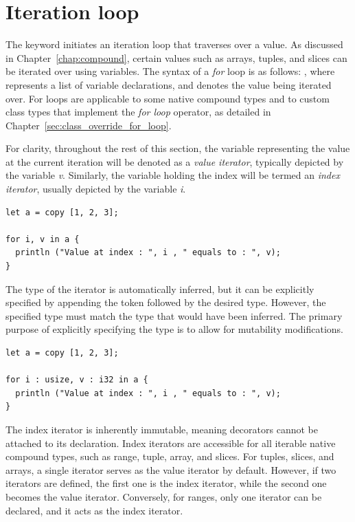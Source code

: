 \section{Iteration loop}%
\label{sec:for_loop}
\label{sec:for_loops}

The keyword  initiates an iteration loop that traverses over a value.
As discussed in Chapter~\ref{chap:compound}, certain values such as arrays,
tuples, and slices can be iterated over using variables. The syntax of a
\textit{for} loop is as follows: , where  represents a list of variable declarations, and  denotes the
value being iterated over. For loops are applicable to some native compound
types and to custom class types that implement the \textit{for loop} operator,
as detailed in Chapter~\ref{sec:class_override_for_loop}.

For clarity, throughout the rest of this section, the variable representing the
value at the current iteration will be denoted as a \textit{value iterator},
typically depicted by the variable \textit{v}. Similarly, the variable holding
the index will be termed an \textit{index iterator}, usually depicted by the
variable \textit{i}.

\begin{lstlisting}[style=coloredverbatim, escapechar=@]
let a = copy [1, 2, 3];

for i, v in a {
  println ("Value at index : ", i , " equals to : ", v);
}
\end{lstlisting}

The type of the iterator is automatically inferred, but it can be explicitly
specified by appending the token \token{:} followed by the desired type.
However, the specified type must match the type that would have been inferred.
The primary purpose of explicitly specifying the type is to allow for mutability
modifications.

\begin{lstlisting}[style=coloredverbatim, escapechar=@]
let a = copy [1, 2, 3];

for i : usize, v : i32 in a {
  println ("Value at index : ", i , " equals to : ", v);
}
\end{lstlisting}

The index iterator is inherently immutable, meaning decorators cannot be
attached to its declaration. Index iterators are accessible for all iterable
native compound types, such as range, tuple, array, and slices. For tuples,
slices, and arrays, a single iterator serves as the value iterator by default.
However, if two iterators are defined, the first one is the index iterator,
while the second one becomes the value iterator. Conversely, for ranges, only
one iterator can be declared, and it acts as the index iterator.

